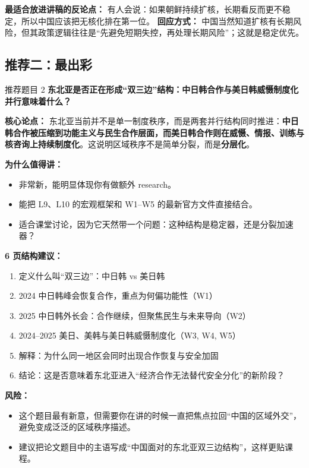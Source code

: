 \documentclass[a4paper]{article}
\begin{document}
\textbf{最适合放进讲稿的反论点：}  
有人会说：如果朝鲜持续扩核，长期看反而更不稳定，所以中国应该把无核化排在第一位。  
\textbf{回应方式：} 中国当然知道扩核有长期风险，但其政策逻辑往往是``先避免短期失控，再处理长期风险''；这就是稳定优先。

\subsection{推荐二：最出彩}

\begin{findingbox}{推荐题目 2}
\textbf{东北亚是否正在形成``双三边''结构：中日韩合作与美日韩威慑制度化并行意味着什么？}
\end{findingbox}

\textbf{核心论点：}  
东北亚当前并不是单一制度秩序，而是两套并行结构同时推进：\textbf{中日韩合作被压缩到功能主义与民生合作层面，而美日韩合作则在威慑、情报、训练与核咨询上持续制度化}。这说明区域秩序不是简单分裂，而是\textbf{分层化}。

\textbf{为什么值得讲：}
\begin{itemize}
\item 非常新，能明显体现你有做额外 research。
\item 能把 L9、L10 的宏观框架和 W1--W5 的最新官方文件直接结合。
\item 适合课堂讨论，因为它天然带一个问题：这种结构是稳定器，还是分裂加速器？
\end{itemize}

\textbf{6 页结构建议：}
\begin{enumerate}
\item 定义什么叫``双三边''：中日韩 vs 美日韩
\item 2024 中日韩峰会恢复合作，重点为何偏功能性（W1）
\item 2025 中日韩外长会：合作继续，但聚焦民生与未来导向（W2）
\item 2024--2025 美日、美韩与美日韩威慑制度化（W3, W4, W5）
\item 解释：为什么同一地区会同时出现合作恢复与安全加固
\item 结论：这是否意味着东北亚进入``经济合作无法替代安全分化''的新阶段？
\end{enumerate}

\textbf{风险：}
\begin{itemize}
\item 这个题目最有新意，但需要你在讲的时候一直把焦点拉回``中国的区域外交''，避免变成泛泛的区域秩序描述。
\item 建议把论文题目中的主语写成``中国面对的东北亚双三边结构''，这样更贴课程。
\end{itemize}
\end{document}
